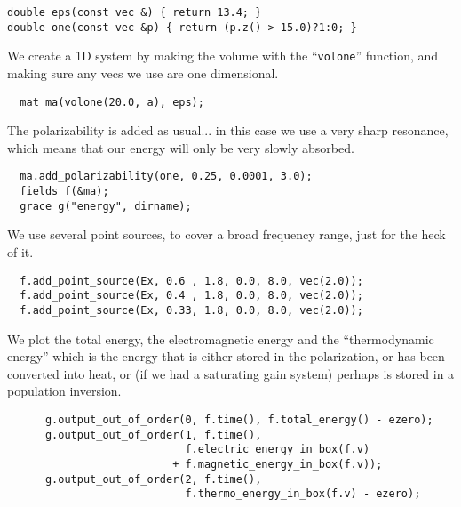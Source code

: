 \begin{verbatim}
double eps(const vec &) { return 13.4; }
double one(const vec &p) { return (p.z() > 15.0)?1:0; }
\end{verbatim}
\begin{comment}
int main(int argc, char **argv) {
  initialize mpi(argc, argv);
  deal_with_ctrl_c();
  const double ttot = 600.0;
\end{comment}
We create a 1D system by making the volume with the ``\verb!volone!''
function, and making sure any vecs we use are one dimensional.
\begin{verbatim}
  mat ma(volone(20.0, a), eps);
\end{verbatim}
\begin{comment}
  const char *dirname = make_output_directory(argv[0]);
  ma.set_output_directory(dirname);
\end{comment}
The polarizability is added as usual... in this case we use a very sharp
resonance, which means that our energy will only be very slowly absorbed.
\begin{verbatim}
  ma.add_polarizability(one, 0.25, 0.0001, 3.0);
  fields f(&ma);
  grace g("energy", dirname);
\end{verbatim}
We use several point sources, to cover a broad frequency range, just for
the heck of it.
\begin{verbatim}
  f.add_point_source(Ex, 0.6 , 1.8, 0.0, 8.0, vec(2.0));
  f.add_point_source(Ex, 0.4 , 1.8, 0.0, 8.0, vec(2.0));
  f.add_point_source(Ex, 0.33, 1.8, 0.0, 8.0, vec(2.0));
\end{verbatim}
\begin{comment}
  const double ezero = f.total_energy();
  double next_printtime = 10;
  while (f.time() < ttot && !interrupt) {
    if (f.time() >= next_printtime) {
      next_printtime += 10;
      master_printf("Working on time %
      master_printf("energy is %
      master_printf("thermo energy is %
      //f.eps_slices();
\end{comment}
We plot the total energy, the electromagnetic energy and the
``thermodynamic energy'' which is the energy that is either stored in the
polarization, or has been converted into heat, or (if we had a saturating
gain system) perhaps is stored in a population inversion.
\begin{verbatim}
      g.output_out_of_order(0, f.time(), f.total_energy() - ezero);
      g.output_out_of_order(1, f.time(),
                            f.electric_energy_in_box(f.v)
                          + f.magnetic_energy_in_box(f.v));
      g.output_out_of_order(2, f.time(),
                            f.thermo_energy_in_box(f.v) - ezero);
\end{verbatim}
\begin{comment}
    }
    f.step();
  }
}
\end{comment}

